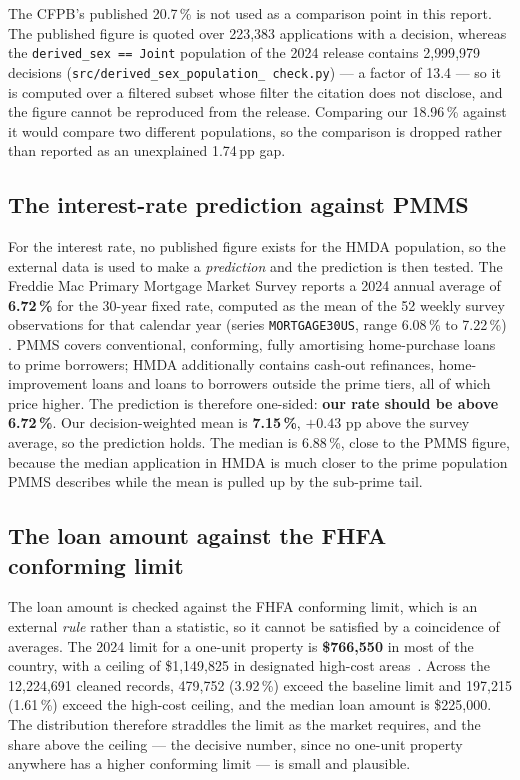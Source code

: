 \documentclass[sigconf,balance=false]{acmart}
\begin{document}
The CFPB's published 20.7\,\% is not used as a comparison point in this
report. The published figure is quoted over 223{,}383 applications with a
decision, whereas the \texttt{derived\_\allowbreak sex == Joint} population
of the 2024 release contains 2{,}999{,}979 decisions
(\texttt{src/derived\_\allowbreak sex\_\allowbreak population\_\allowbreak
check.py}) --- a factor of 13.4 --- so it is computed over a filtered subset
whose filter the citation does not disclose, and the figure cannot be
reproduced from the release. Comparing our 18.96\,\% against it would
compare two different populations, so the comparison is dropped rather than
reported as an unexplained 1.74\,pp gap.


\subsection{The interest-rate prediction against PMMS}

For the interest rate, no published figure exists for the HMDA population,
so the external data is used to make a \emph{prediction} and the prediction
is then tested. The Freddie Mac Primary Mortgage Market Survey reports a
2024 annual average of \textbf{6.72\,\%} for the 30-year fixed rate,
computed as the mean of the 52 weekly survey observations for that calendar
year (series \texttt{MORTGAGE30US}, range 6.08\,\% to 7.22\,\%)
\cite{pmms}. PMMS covers conventional, conforming, fully amortising
home-purchase loans to prime borrowers; HMDA additionally contains cash-out
refinances, home-improvement loans and loans to borrowers outside the prime
tiers, all of which price higher. The prediction is therefore one-sided:
\textbf{our rate should be above 6.72\,\%}. Our decision-weighted mean is
\textbf{7.15\,\%}, $+0.43$ pp above the survey average, so the prediction
holds. The median is 6.88\,\%, close to the PMMS figure, because the median
application in HMDA is much closer to the prime population PMMS describes
while the mean is pulled up by the sub-prime tail.

\subsection{The loan amount against the FHFA conforming limit}

The loan amount is checked against the FHFA conforming limit, which is an
external \emph{rule} rather than a statistic, so it cannot be satisfied by a
coincidence of averages. The 2024 limit for a one-unit property is
\textbf{\$766{,}550} in most of the country, with a ceiling of \$1{,}149{,}825
in designated high-cost areas~\cite{fhfa}. Across the 12{,}224{,}691 cleaned
records, 479{,}752 (3.92\,\%) exceed the baseline limit and 197{,}215
(1.61\,\%) exceed the high-cost ceiling, and the median loan amount is
\$225{,}000. The distribution therefore straddles the limit as the market
requires, and the share above the ceiling --- the decisive number, since no
one-unit property anywhere has a higher conforming limit --- is small and
plausible.
\end{document}
